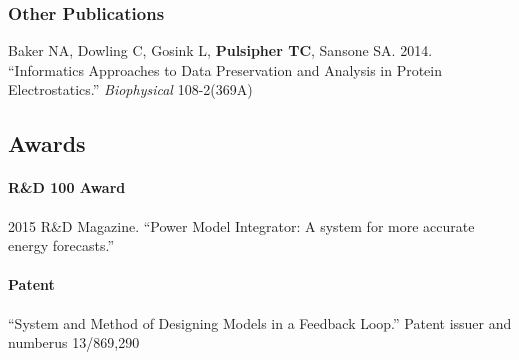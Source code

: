 \documentclass[11pt,]{article}
\let\oldparagraph\paragraph
\renewcommand{\paragraph}[1]{\oldparagraph{#1}\mbox{}}
\begin{document}
\subsubsection{Other Publications}\label{other-publications}

Baker NA, Dowling C, Gosink L, \textbf{Pulsipher TC}, Sansone SA. 2014.
``Informatics Approaches to Data Preservation and Analysis in Protein
Electrostatics.'' \emph{Biophysical} 108-2(369A)

\subsection{Awards}\label{awards}

\paragraph{R\&D 100 Award}\label{rd-100-award}

2015 R\&D Magazine. ``Power Model Integrator: A system for more accurate
energy forecasts.''

\paragraph{Patent}\label{patent}

``System and Method of Designing Models in a Feedback Loop.'' Patent
issuer and numberus 13/869,290
\end{document}
